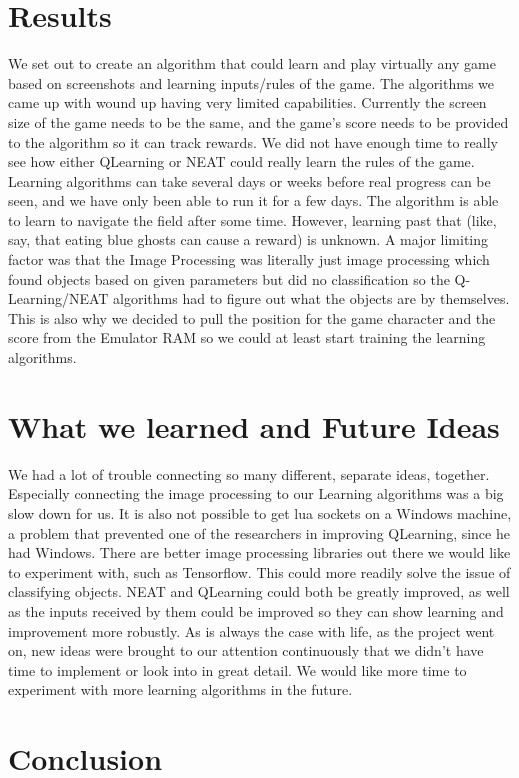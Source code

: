 \documentclass[12pt,journal,compsoc]{IEEEtran}
\begin{document}
\section{Results}
We set out to create an algorithm that could learn and play virtually any game based on screenshots and learning inputs/rules of the game. The algorithms we came up with wound up having very limited capabilities. Currently the screen size of the game needs to be the same, and the game’s score needs to be provided to the algorithm so it can track rewards. We did not have enough time to really see how either QLearning or NEAT could really learn the rules of the game. Learning algorithms can take several days or weeks before real progress can be seen, and we have only been able to run it for a few days. The algorithm is able to learn to navigate the field after some time. However, learning past that (like, say, that eating blue ghosts can cause a reward) is unknown. A major limiting factor was that the Image Processing was literally just image processing which found objects based on given parameters but did no classification so the Q-Learning/NEAT algorithms had to figure out what the objects are by themselves. This is also why we decided to pull the position for the game character and the score from the Emulator RAM so we could at least start training the learning algorithms.

\section{What we learned and Future Ideas}
We had a lot of trouble connecting so many different, separate ideas, together. Especially connecting the image processing to our Learning algorithms was a big slow down for us. It is also not possible to get lua sockets on a Windows machine, a problem that prevented one of the researchers in improving QLearning, since he had Windows. There are better image processing libraries out there we would like to experiment with, such as Tensorflow. This could more readily solve the issue of classifying objects. NEAT and QLearning could both be greatly improved, as well as the inputs received by them could be improved so they can show learning and improvement more robustly. As is always the case with life, as the project went on, new ideas were brought to our attention continuously that we didn’t have time to implement or look into in great detail. We would like more time to experiment with more learning algorithms in the future.


\section{Conclusion}
\end{document}

